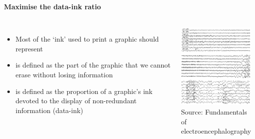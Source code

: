\documentclass[8pt]{beamer}
\begin{document}

\begin{frame}
\frametitle{\insertsection}
\framesubtitle{Maximise the data-ink ratio}

\begin{columns}[c]
    \begin{itemize}
    \item Most of the `ink' used to print a graphic should represent {\color{blue}{data-information}}
    \item {\color{blue}{Data-ink}} is defined as the part of the graphic that we cannot erase without losing information
    \item {\color{blue}{Data-ink ratio}} is defined as the proportion of a graphic's ink devoted to the display of non-redundant information (data-ink)
\end{itemize}

\centering
\includegraphics[width=5cm]{data_ink}\\
\tiny{Source: Fundamentals of electroencephalography \cite{Tufte2001}}
\end{columns}


\end{frame}

\end{document}
